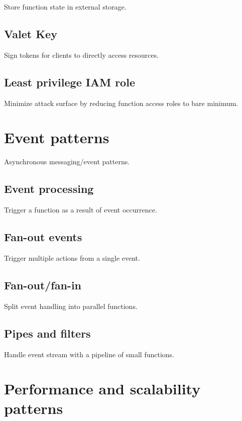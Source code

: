 Store function state in external storage.

\subsection{Valet Key} \label{subsubsec:valetKey}

Sign tokens for clients to directly access resources.

\subsection{Least privilege IAM role} \label{subsubsec:LeastprivilegeIAMrole}

Minimize attack surface by reducing function access roles to bare minimum.

\section{Event patterns} \label{sec:eventPatterns}

Asynchronous messaging/event patterns.

\subsection{Event processing} \label{subsubsec:Eventprocessing}

Trigger a function as a result of event occurrence.

\subsection{Fan-out events} \label{subsubsec:FanoutEvents}

Trigger multiple actions from a single event.

\subsection{Fan-out/fan-in} \label{subsubsec:FanoutFanin}

Split event handling into parallel functions.

\subsection{Pipes and filters} \label{subsubsec:PipesAndFilters}

Handle event stream with a pipeline of small functions.

\section{Performance and scalability patterns} \label{sec:perfPatterns}

